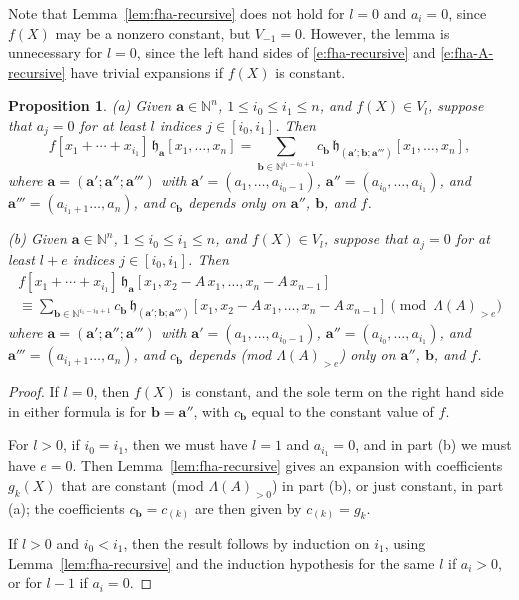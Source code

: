 \documentclass[12pt]{amsart}
\newtheorem{prop}[thm]{Proposition}
\theoremstyle{definition}
\theoremstyle{remark}
\newcommand{\NN}{{\mathbb N}}
\newcommand{\aA}{{\mathbf a}}
\newcommand{\bb}{{\mathbf b}}
\newcommand{\fh}{{\mathfrak h}}
\begin{document}
Note that Lemma~\ref{lem:fha-recursive} does not hold for $l=0$ and
$a_{i} = 0$, since $f(X)$ may be a nonzero constant, but $V_{-1} = 0$.
However, the lemma is unnecessary for $l=0$, since the left hand sides
of \eqref{e:fha-recursive} and \eqref{e:fha-A-recursive} have trivial
expansions if $f(X)$ is constant.

\begin{prop}\label{prop:symm-by-ha}
(a) Given $\aA \in \NN ^{n}$, $1\leq i_{0}\leq i_{1}\leq n$, and
$f(X)\in V_{l}$, suppose that $a_{j} = 0$ for at least $l$ indices
$j\in [i_{0},i_{1}]$.  Then
\begin{equation}\label{e:symm-by-ha}
f[x_{1}+\cdots +x_{i_{1}}] \, \fh_{\aA }[x_{1}, \ldots, x_{n}] = \sum
_{\bb \in \NN ^{i_{1}-i_{0}+1} }c_{\bb }\, \fh_{(\aA';\bb
;\aA''')}[x_{1}, \ldots, x_{n}],
\end{equation}
where $\aA = (\aA '; \aA ''; \aA ''')$ with $\aA' = (a_1,\ldots ,
a_{i_0-1})$, $\aA'' = (a_{i_0},\ldots , a_{i_1})$, and $\aA''' =
(a_{i_1+1}\ldots , a_{n})$, and $c_{\bb }$ depends only on $\aA ''$,
$\bb $, and $f$.

(b) Given $\aA \in \NN ^{n}$, $1\leq i_{0}\leq i_{1}\leq n$, and
$f(X)\in V_{l}$, suppose that $a_{j} = 0$ for at least $l+e$ indices
$j\in [i_{0},i_{1}]$.  Then
\begin{multline}\label{e:symm-by-ha-A}
f[x_{1}+\cdots +x_{i_{1}}] \, \fh_{\aA }[x_{1}, x_{2} - A\, x_{1},
\ldots, x_{n} - A\, x_{n-1}]\\
\equiv \sum _{\bb \in \NN ^{i_{1}-i_{0}+1} } c_{\bb }\, \fh_{(\aA';\bb
;\aA''')}[x_{1}, x_{2} - A\, x_{1}, \ldots, x_{n} - A\, x_{n-1}]
\pmod{\Lambda (A)_{>e}}
\end{multline}
where $\aA = (\aA '; \aA ''; \aA ''')$ with $\aA' = (a_1,\ldots ,
a_{i_0-1})$, $\aA'' = (a_{i_0},\ldots , a_{i_1})$, and $\aA''' =
(a_{i_1+1}\ldots , a_{n})$, and $c_{\bb }$ depends {\rm (mod $\Lambda
(A)_{>e}$)} only on $\aA ''$, $\bb $, and $f$.
\end{prop}


\begin{proof}
If $l=0$, then $f(X)$ is constant, and the sole term on the right hand
side in either formula is for $\bb =\aA ''$, with $c_{\bb }$ equal to
the constant value of $f$.

For $l>0$, if $i_{0} = i_{1}$, then we must have $l=1$ and $a_{i_1} =
0$, and in part (b) we must have $e=0$.  Then
Lemma~\ref{lem:fha-recursive} gives an expansion with coefficients
$g_{k}(X)$ that are constant (mod $\Lambda (A)_{>0}$) in part (b), or
just constant, in part (a); the coefficients $c_{\bb } = c_{(k)}$ are
then given by $c_{(k)} = g_{k}$.

If $l>0$ and $i_{0}<i_{1}$, then the result follows by induction on
$i_{1}$, using Lemma~\ref{lem:fha-recursive} and the induction
hypothesis for the same $l$ if $a_{i}>0$, or for $l-1$ if $a_{i} = 0$.
\end{proof}
\end{document}

